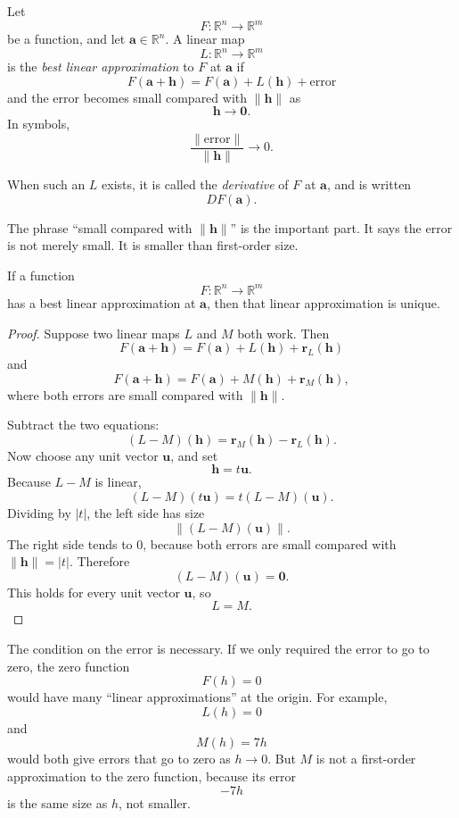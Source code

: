 \begin{definition}
Let
\[
    F:\mathbb R^n\to\mathbb R^m
\]
be a function, and let \(\mathbf a\in\mathbb R^n\).  A linear map
\[
    L:\mathbb R^n\to\mathbb R^m
\]
is the \emph{best linear approximation} to \(F\) at \(\mathbf a\) if
\[
    F(\mathbf a+\mathbf h)
    =
    F(\mathbf a)+L(\mathbf h)+\text{error}
\]
and the error becomes small compared with \(\|\mathbf h\|\) as
\[
    \mathbf h\to\mathbf 0.
\]
In symbols,
\[
    \frac{\|\text{error}\|}{\|\mathbf h\|}\to0.
\]

When such an \(L\) exists, it is called the \emph{derivative} of \(F\) at \(\mathbf a\),
and is written
\[
    DF(\mathbf a).
\]
\end{definition}

The phrase ``small compared with \(\|\mathbf h\|\)'' is the important part.  It says the
error is not merely small.  It is smaller than first-order size.

\begin{theorem}
If a function
\[
    F:\mathbb R^n\to\mathbb R^m
\]
has a best linear approximation at \(\mathbf a\), then that linear approximation is
unique.
\end{theorem}

\begin{proof}
Suppose two linear maps \(L\) and \(M\) both work.  Then
\[
    F(\mathbf a+\mathbf h)
    =
    F(\mathbf a)+L(\mathbf h)+\mathbf r_L(\mathbf h)
\]
and
\[
    F(\mathbf a+\mathbf h)
    =
    F(\mathbf a)+M(\mathbf h)+\mathbf r_M(\mathbf h),
\]
where both errors are small compared with \(\|\mathbf h\|\).

Subtract the two equations:
\[
    (L-M)(\mathbf h)=\mathbf r_M(\mathbf h)-\mathbf r_L(\mathbf h).
\]
Now choose any unit vector \(\mathbf u\), and set
\[
    \mathbf h=t\mathbf u.
\]
Because \(L-M\) is linear,
\[
    (L-M)(t\mathbf u)=t(L-M)(\mathbf u).
\]
Dividing by \(|t|\), the left side has size
\[
    \|(L-M)(\mathbf u)\|.
\]
The right side tends to \(0\), because both errors are small compared with
\(\|\mathbf h\|=|t|\).  Therefore
\[
    (L-M)(\mathbf u)=\mathbf 0.
\]
This holds for every unit vector \(\mathbf u\), so
\[
    L=M.
\]
\end{proof}

The condition on the error is necessary.  If we only required the error to go to zero,
the zero function
\[
    F(h)=0
\]
would have many ``linear approximations'' at the origin.  For example,
\[
    L(h)=0
\]
and
\[
    M(h)=7h
\]
would both give errors that go to zero as \(h\to0\).  But \(M\) is not a first-order
approximation to the zero function, because its error
\[
    -7h
\]
is the same size as \(h\), not smaller.


